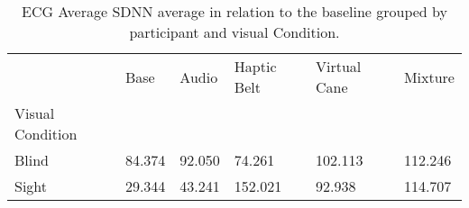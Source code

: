 
\begin{table}[!htb]
\centering
\caption{ECG Average SDNN average in relation to the baseline grouped by participant and visual Condition.}
\label{tab:ecg_sdnn_average_group}
\begin{tabular}{llllll}
\toprule
{} &   Base &  Audio &  Haptic Belt &  Virtual Cane &  Mixture \\
Visual Condition &        &        &              &               &          \\
\midrule
Blind            & 84.374 & 92.050 &       74.261 &       102.113 &  112.246 \\
Sight            & 29.344 & 43.241 &      152.021 &        92.938 &  114.707 \\
\bottomrule
\end{tabular}
\end{table}

